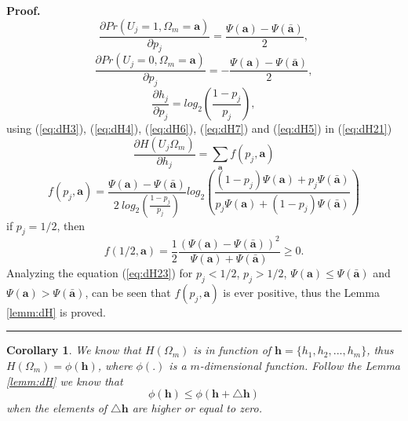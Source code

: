 \documentclass[a4paper,10pt]{article}
\newtheorem{corollary}[mytheorem]{Corollary}
\newenvironment{myproof}[1][Proof]{\textbf{#1.} }{\ \rule{0.5em}{0.5em}}
\begin{document}
\begin{myproof}
\begin{equation}
\end{equation}
\begin{equation}\label{eq:dH6}
 \frac{\partial Pr(U_j=1,\Omega_{m}=\mathbf{a})}{\partial p_j}=\frac{ \Psi(\mathbf{a}) -\Psi(\mathbf{\bar{a}}) }{2},
\end{equation}
\begin{equation}\label{eq:dH7}
 \frac{\partial Pr(U_j=0,\Omega_{m}=\mathbf{a})}{\partial p_j}=-\frac{ \Psi(\mathbf{a}) -\Psi(\mathbf{\bar{a}}) }{2},
\end{equation}
\begin{equation}\label{eq:dH5}
 \frac{\partial h_j}{\partial p_j}=log_2 \left( \frac{1-p_j}{p_j}\right),
\end{equation}
using (\ref{eq:dH3}), (\ref{eq:dH4}), (\ref{eq:dH6}), (\ref{eq:dH7}) and (\ref{eq:dH5}) in (\ref{eq:dH21})
\begin{equation}\label{eq:dH22}
\frac{\partial H(U_j\Omega_{m})}{\partial h_j} = \sum \limits_{\mathbf{a}} f(p_j,\mathbf{a})
\end{equation}
\begin{equation}\label{eq:dH23}
f(p_j,\mathbf{a}) = \frac{ \Psi(\mathbf{a}) -\Psi(\mathbf{\bar{a}}) }{2~log_2 \left( \frac{1-p_j}{p_j}\right)} log_2\left( \frac{ (1-p_j)\Psi(\mathbf{a}) + p_j\Psi(\mathbf{\bar{a}}) }{ p_j\Psi(\mathbf{a}) + (1-p_j)\Psi(\mathbf{\bar{a}}) }\right)
\end{equation}
if $p_j=1/2$, then
\begin{equation}\label{eq:dH24}
f(1/2,\mathbf{a}) = \frac{1}{2}\frac{ (\Psi(\mathbf{a}) -\Psi(\mathbf{\bar{a}}))^2 }{\Psi(\mathbf{a}) + \Psi(\mathbf{\bar{a}})} \geq 0.
\end{equation}
Analyzing the equation (\ref{eq:dH23}) for $p_j<1/2$, $p_j>1/2$, 
$\Psi(\mathbf{a}) \leq \Psi(\mathbf{\bar{a}})$ and $\Psi(\mathbf{a}) > \Psi(\mathbf{\bar{a}})$,
can be seen that $f(p_j,\mathbf{a})$ is ever positive, thus the Lemma \ref{lemm:dH} 
is proved.
\end{myproof}

\begin{mdframed}[style=MDFStyGrayScreen]
\begin{corollary}
 \label{corol:dH}  We know that  $H(\Omega_m)$
is in function of $\mathbf{h}=\{h_1, h_2, ..., h_m\}$, thus 
$H(\Omega_m) = \phi(\mathbf{h})$, where $\phi(.)$ is a $m$-dimensional function.
Follow the Lemma \ref{lemm:dH} we know that
\begin{equation}\label{eq:coro1}
\phi(\mathbf{h}) \leq \phi(\mathbf{h} +  \mathbf{\triangle h}) 
\end{equation}
when the elements of $\mathbf{\triangle h}$ are higher or equal to zero.
\end{corollary}
\end{mdframed}
\end{document}
